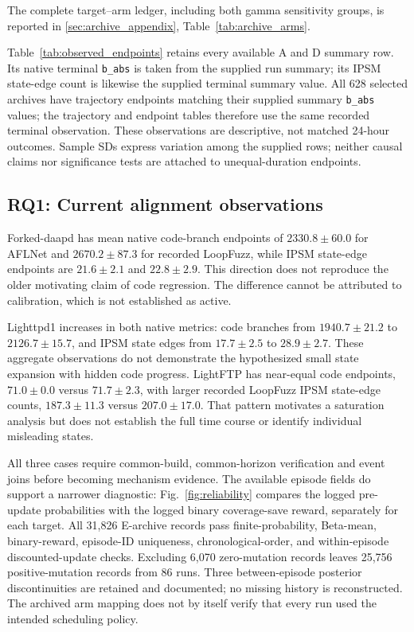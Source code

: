 \documentclass[final,5p,times,number]{elsarticle}
\newcommand{\figref}[1]{Fig.~\ref{#1}}
\begin{document}

The complete target--arm ledger, including both gamma sensitivity groups, is reported in \ref{sec:archive_appendix}, Table~\ref{tab:archive_arms}.

Table~\ref{tab:observed_endpoints} retains every available A and D summary row. Its native terminal \texttt{b\_abs} is taken from the supplied run summary; its IPSM state-edge count is likewise the supplied terminal summary value. All 628 selected archives have trajectory endpoints matching their supplied summary \texttt{b\_abs} values; the trajectory and endpoint tables therefore use the same recorded terminal observation. These observations are descriptive, not matched 24-hour outcomes. Sample SDs express variation among the supplied rows; neither causal claims nor significance tests are attached to unequal-duration endpoints.

\subsection{RQ1: Current alignment observations}
Forked-daapd has mean native code-branch endpoints of $2330.8\pm60.0$ for AFLNet and $2670.2\pm87.3$ for recorded LoopFuzz, while IPSM state-edge endpoints are $21.6\pm2.1$ and $22.8\pm2.9$. This direction does not reproduce the older motivating claim of code regression. The difference cannot be attributed to calibration, which is not established as active.

Lighttpd1 increases in both native metrics: code branches from $1940.7\pm21.2$ to $2126.7\pm15.7$, and IPSM state edges from $17.7\pm2.5$ to $28.9\pm2.7$. These aggregate observations do not demonstrate the hypothesized small state expansion with hidden code progress. LightFTP has near-equal code endpoints, $71.0\pm0.0$ versus $71.7\pm2.3$, with larger recorded LoopFuzz IPSM state-edge counts, $187.3\pm11.3$ versus $207.0\pm17.0$. That pattern motivates a saturation analysis but does not establish the full time course or identify individual misleading states.

All three cases require common-build, common-horizon verification and event joins before becoming mechanism evidence. The available episode fields do support a narrower diagnostic: \figref{fig:reliability} compares the logged pre-update probabilities with the logged binary coverage-save reward, separately for each target. All 31,826 E-archive records pass finite-probability, Beta-mean, binary-reward, episode-ID uniqueness, chronological-order, and within-episode discounted-update checks. Excluding 6,070 zero-mutation records leaves 25,756 positive-mutation records from 86 runs. Three between-episode posterior discontinuities are retained and documented; no missing history is reconstructed. The archived arm mapping does not by itself verify that every run used the intended scheduling policy.
\end{document}
